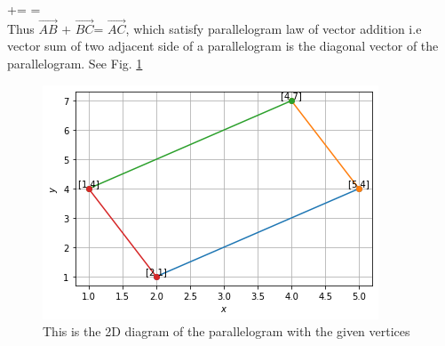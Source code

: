 += =\\

Thus $\vec{AB}$ $+$ $\vec{BC}$= $\vec{AC}$, which satisfy
parallelogram law of vector addition i.e vector
sum of two adjacent side of a parallelogram is the
diagonal vector of the parallelogram.  See Fig.     \ref{eq:solutions/1/1/3/myfig:1}

\begin{figure}[!]
 \begin{center}
  \includegraphics[width=\columnwidth]{solutions/1/1/3/assignment2_fig.png}
    \caption{This is the 2D diagram of the parallelogram with the given vertices}
    \label{eq:solutions/1/1/3/myfig:1}
    \end{center}
\end{figure}
